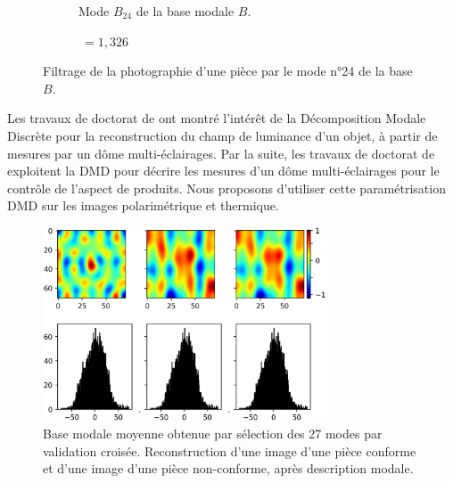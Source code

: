 \begin{figure}[htb]
\begin{subfigure}[c]{0.37\textwidth}
		\caption{Mode $B_{24}$ de la base modale $B$.}
	\end{subfigure}
	\begin{subfigure}[r]{0.20\textwidth}
		$\ = 1,326$
	\end{subfigure}
	\caption{Filtrage de la photographie d'une pièce par le mode n°24 de la base $B$.}
	\label{fig:dmd_filtering}
\end{figure}

Les travaux de doctorat de \citeauthor{pitard_metrologie_2016} \cite{pitard_metrologie_2016} ont montré l'intérêt de la Décomposition Modale Discrète pour la reconstruction du champ de luminance d'un objet, à partir de mesures par un dôme multi-éclairages.
Par la suite, les travaux de doctorat de \citeauthor{lacombe_exploitation_2018a} \cite{lacombe_exploitation_2018a} exploitent la DMD pour décrire les mesures d'un dôme multi-éclairages pour le contrôle de l'aspect de produits.
Nous proposons d'utiliser cette paramétrisation DMD sur les images polarimétrique et thermique.

\begin{figure}[htb]
	\centering
	\includegraphics[width=0.75\textwidth]{../Chap2/Figures/DMD_reconstruction_27modes.png}
	\caption{Base modale moyenne obtenue par sélection des 27 modes par validation croisée. Reconstruction d'une image d'une pièce conforme et d'une image d'une pièce non-conforme, après description modale.}
	\label{fig:dmd_reconstruction}
\end{figure}

